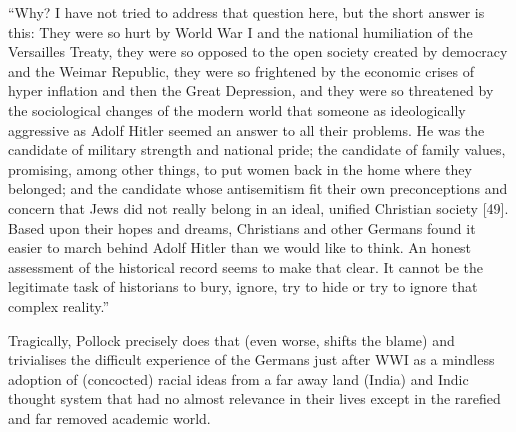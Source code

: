 \begin{myquote}
“Why? I have not tried to address that question here, but the short answer is this: They were so hurt by World War I and the national humiliation of the Versailles Treaty, they were so opposed to the open society created by democracy and the Weimar Republic, they were so frightened by the economic crises of hyper inflation and then the Great Depression, and they were so threatened by the sociological changes of the modern world that someone as ideologically aggressive as Adolf Hitler seemed an answer to all their problems. He was the candidate of military strength and national pride; the candidate of family values, promising, among other things, to put women back in the home where they belonged; and the candidate whose antisemitism fit their own preconceptions and concern that Jews did not really belong in an ideal, unified Christian society [49]. Based upon their hopes and dreams, Christians and other Germans found it easier to march behind Adolf Hitler than we would like to think. An honest assessment of the historical record seems to make that clear. It cannot be the legitimate task of historians to bury, ignore, try to hide or try to ignore that complex reality.”
\end{myquote}
\newpage

Tragically, Pollock precisely does that (even worse, shifts the blame) and trivialises the difficult experience of the Germans just after WWI as a mindless adoption of (concocted) racial ideas from a far away land (India) and Indic thought system that had no almost relevance in their lives except in the rarefied and far removed academic world.

